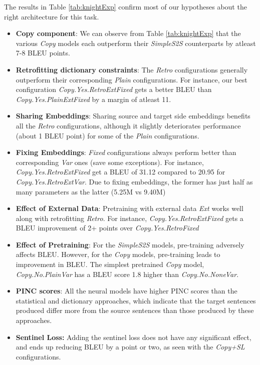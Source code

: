%




The results in Table \ref{tab:knightExp} confirm most of our hypotheses about the right architecture for this task.
\begin{itemize}
    \item \textbf{Copy component}: We can observe from Table \ref{tab:knightExp} that the various \emph{Copy} models each outperform their \emph{SimpleS2S} counterparts by atleast 7-8 BLEU points.
    \item \textbf{Retrofitting dictionary constraints}: The \emph{Retro} configurations generally outperform their corresponding \emph{Plain} configurations. For instance, our best configuration \emph{Copy.Yes.RetroExtFixed} gets a better BLEU than \emph{Copy.Yes.PlainExtFixed} by a margin of atleast 11.
    \item \textbf{Sharing Embeddings}: Sharing source and target side embeddings benefits all the \emph{Retro} configurations, although it slightly deteriorates performance (about 1 BLEU point) for some of the \emph{Plain} configurations. 
    \item \textbf{Fixing Embeddings}: \emph{Fixed} configurations always perform better than corresponding \emph{Var} ones (save some exceptions). For instance, \emph{Copy.Yes.RetroExtFixed} get a BLEU of 31.12 compared to 20.95 for \emph{Copy.Yes.RetroExtVar}. Due to fixing embeddings, the former has just half as many parameters as the latter (5.25M vs 9.40M)
    \item \textbf{Effect of External Data}: Pretraining with external data \emph{Ext} works well along with retrofitting \emph{Retro}. For instance, \emph{Copy.Yes.RetroExtFixed} gets a BLEU improvement of 2+ points over \emph{Copy.Yes.RetroFixed}
    \item \textbf{Effect of Pretraining}: For the \emph{SimpleS2S} models, pre-training adversely affects BLEU. However, for the \emph{Copy} models, pre-training leads to improvement in BLEU. The simplest pretrained \emph{Copy} model, \emph{Copy.No.PlainVar} has a BLEU score 1.8 higher than \emph{Copy.No.NoneVar}.
    \item \textbf{PINC scores}: All the neural models have higher PINC scores than the statistical and dictionary approaches, which indicate that the target sentences produced differ more from the source sentences than those produced by these approaches.
    \item \textbf{Sentinel Loss:} Adding the sentinel loss does not have any significant effect, and ends up reducing BLEU by a point or two, as seen with the \emph{Copy+SL} configurations.
\end{itemize}

